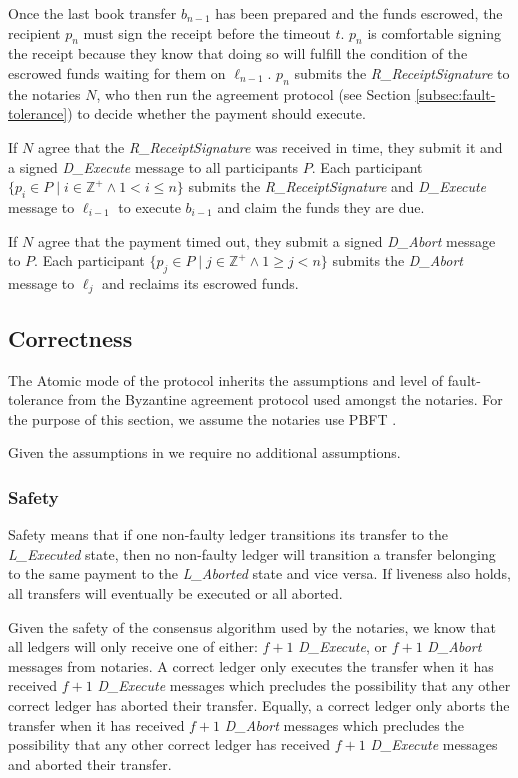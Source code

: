 \documentclass[letterpaper,twocolumn,10pt]{article}
\begin{document}
Once the last book transfer $b_{n-1}$ has been prepared and the funds escrowed, the recipient $p_n$ must sign the receipt before the timeout $t$. $p_n$ is comfortable signing the receipt because they know that doing so will fulfill the condition of the escrowed funds waiting for them on $\ell_{n-1}$. $p_n$ submits the \textit{R\_ReceiptSignature} to the notaries $N$, who then run the agreement protocol (see Section \ref{subsec:fault-tolerance}) to decide whether the payment should execute.

If $N$ agree that the \textit{R\_ReceiptSignature} was received in time, they submit it and a signed \textit{D\_Execute} message to all participants $P$. Each participant $ \{ p_i \in P \mid i \in \mathbb{Z}^+ \land 1 < i \leq n \} $ submits the \textit{R\_ReceiptSignature} and \textit{D\_Execute} message to $\ell_{i-1}$ to execute $b_{i-1}$ and claim the funds they are due.

If $N$ agree that the payment timed out, they submit a signed \textit{D\_Abort} message to $P$. Each participant $ \{ p_j \in P \mid j \in \mathbb{Z}^+ \land 1 \geq j < n \} $ submits the \textit{D\_Abort} message to $\ell_j$ and reclaims its escrowed funds.


\subsection{Correctness}

The Atomic mode of the protocol inherits the assumptions and level of fault-tolerance from the Byzantine agreement protocol used amongst the notaries. For the purpose of this section, we assume the notaries use PBFT \cite{castro1999practical}.

Given the assumptions in \cite{castro1999practical} we require no additional assumptions.


\subsubsection{Safety}

Safety means that if one non-faulty ledger transitions its transfer to the \textit{L\_Executed} state, then no non-faulty ledger will transition a transfer belonging to the same payment to the \textit{L\_Aborted} state and vice versa. If liveness also holds, all transfers will eventually be executed or all aborted.

Given the safety of the consensus algorithm used by the notaries,
we know that all ledgers will only receive one of either: $f + 1$ \textit{D\_Execute}, or $f + 1$ \textit{D\_Abort} messages from notaries. A correct ledger only executes the transfer when it has received $f + 1$ \textit{D\_Execute} messages which precludes the possibility that any other correct ledger has aborted their transfer. Equally, a correct ledger only aborts the transfer when it has received $f + 1$ \textit{D\_Abort} messages which precludes the possibility that any other correct ledger has received $f + 1$ \textit{D\_Execute} messages and aborted their transfer.
\end{document}

